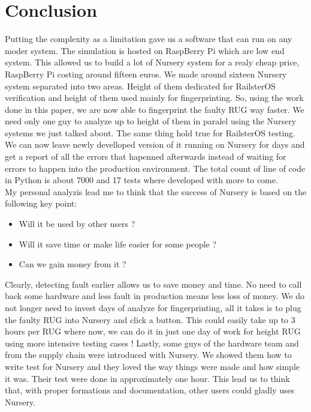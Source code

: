\documentclass[12pt]{article}
\begin{document}

\clearpage
\part{Conclusion}

Putting the complexity as a limitation gave us a software that can run on any moder system. The simulation is hosted on RaspBerry Pi which are low end system. This allowed us to build a lot of Nursery system for a realy cheap price, RaspBerry Pi costing around fifteen euros. We made around sixteen Nursery system separated into two areas. Height of them dedicated for RailsterOS verification and height of them used mainly for fingerprinting. So, using the work done in this paper, we are now able to fingerprint the faulty RUG way faster. We need only one guy to analyze up to height of them in paralel using the Nursery systems we just talked about. The same thing hold true for RailsterOS testing. We can now leave newly develloped version of it running on Nursery for days and get a report of all the errors that hapenned afterwards instead of waiting for errors to happen into the production environment. The total count of line of code in Python is about 7000 and 17 tests where developed with more to come.\\

My personal analyzis lead me to think that the success of Nursery is based on the following key point:
\begin{itemize}
\item Will it be used by other users ?
\item Will it save time or make life easier for some people ?
\item Can we gain money from it ?
\end{itemize}

Clearly, detecting fault earlier allows us to save money and time. No need to call back some hardware and less fault in production means less loss of money. We do not longer need to invest days of analyze for fingerprinting, all it takes is to plug the faulty RUG into Nursery and click a button. This could easily take up to 3 hours per RUG where now, we can do it in just one day of work for height RUG using more intensive testing cases ! Lastly, some guys of the hardware team and from the supply chain were introduced with Nursery. We showed them how to write test for Nursery and they loved the way things were made and how simple it was. Their test were done in approximately one hour. This lead us to think that, with proper formations and documentation, other users could gladly uses Nursery.\\
\end{document}

